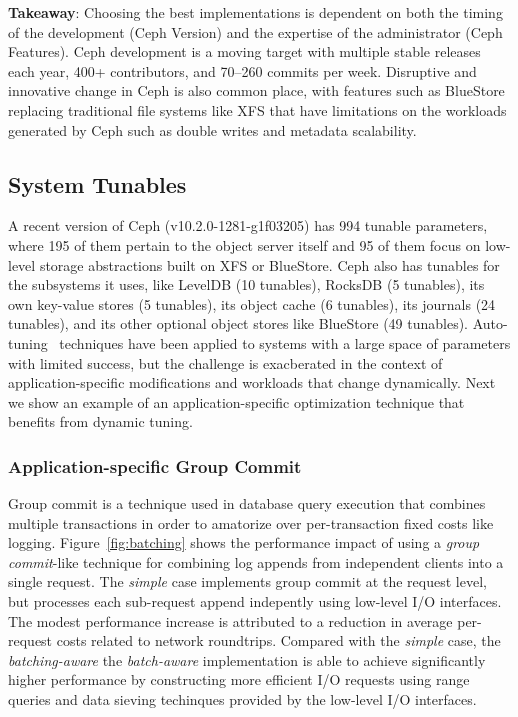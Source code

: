 \textbf{Takeaway}: Choosing the best implementations is dependent on both the
timing of the development (Ceph Version) and the expertise of the
administrator (Ceph Features). Ceph development is a moving target with
multiple stable releases each year, 400+ contributors, and 70--260 commits per
week.  Disruptive and innovative change in Ceph is also common place, with
features such as BlueStore~\cite{weil:vault2016-bluestore} replacing
traditional file systems like XFS that have limitations on the workloads
generated by Ceph such as double writes and metadata scalability. 

\subsection{System Tunables}

A recent version of Ceph (v10.2.0-1281-g1f03205) has 994 tunable
parameters, where 195 of them pertain to the object server itself
and 95 of them focus on low-level storage abstractions built on XFS or
BlueStore. Ceph also has tunables for the subsystems it uses, like
LevelDB (10 tunables), RocksDB (5 tunables), its own key-value stores (5
tunables), its object cache (6 tunables), its journals (24 tunables), and its
other optional object stores like BlueStore (49 tunables).
Auto-tuning~\cite{behzad:sc2013-autotuning} techniques have been applied to
systems with a large space of parameters with limited success, but the
challenge is exacberated in the context of application-specific modifications
and workloads that change dynamically. Next we show an example of an
application-specific optimization technique that benefits from dynamic tuning.

\subsubsection{Application-specific Group Commit}

Group commit is a technique used in database query execution that combines
multiple transactions in order to amatorize over per-transaction fixed costs
like logging. Figure~\ref{fig:batching} shows the performance impact of using
a \emph{group commit}-like technique for combining log appends from
independent clients into a single request.  The \emph{simple} case implements
group commit at the request level, but processes each sub-request append
indepently using low-level I/O interfaces. The modest performance increase is
attributed to a reduction in average per-request costs related to network
roundtrips. Compared with the \emph{simple} case, the \emph{batching-aware}
the \emph{batch-aware} implementation is able to achieve significantly higher
performance by constructing more efficient I/O requests using range queries
and data sieving techinques provided by the low-level I/O interfaces.


